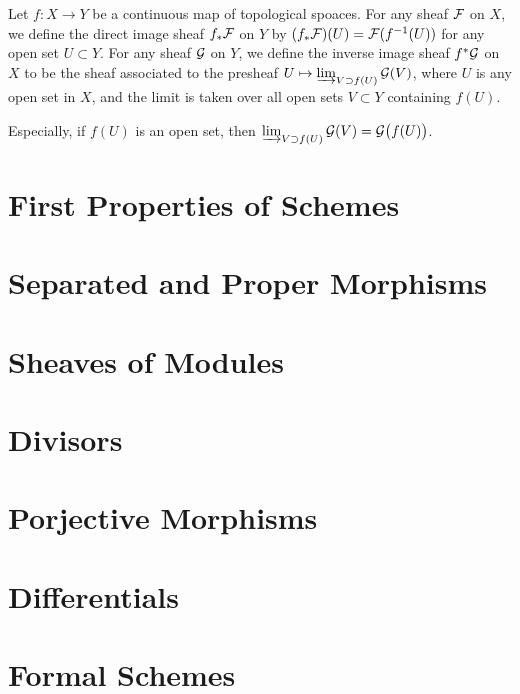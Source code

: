 \documentclass[10pt]{extbook}
\begin{document}
\para Let $f:X\to Y$ be a continuous map of topological spoaces. For any sheaf $\mathcal{F}$ 
on $X$, we define the direct image sheaf $f_*\mathcal{F}$ on $Y$ by 
$(f_*\mathcal{F})(U)=\mathcal{F}(f^{-1}(U))$ for any open set $U\subset Y$. For any sheaf $\mathcal{G}$ on
 $Y$, we define the inverse image sheaf $f^*\mathcal{G}$ on $X$ to be the sheaf associated 
 to the presheaf $U\mapsto \varinjlim_{V \supset f(U)}\mathcal{G}(V)$, where $U$ is any open 
 set in $X$, and the limit is taken over all open sets $V\subset Y$ containing $f(U)$. 

Especially, if $f(U)$ is an open set, then $\varinjlim_{V \supset f(U)}\mathcal{G}(V)=\mathcal{G}\bigl(f(U)\bigr)$.

\section{First Properties of Schemes}
\section{Separated and Proper Morphisms}
\section{Sheaves of Modules}
\section{Divisors}
\section{Porjective Morphisms}
\section{Differentials}
\section{Formal Schemes}
\end{document}
